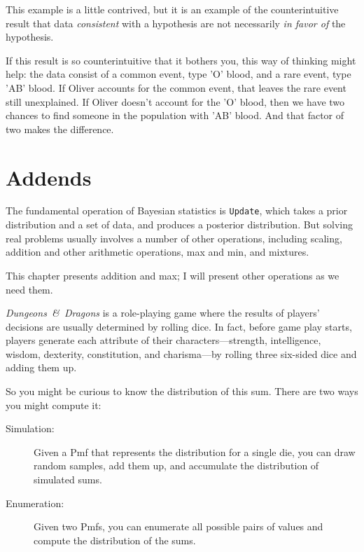 \documentclass[12pt]{book}
\begin{document}
This example is a little contrived, but it is an example of
the counterintuitive result that data {\it consistent} with
a hypothesis are not necessarily {\it in favor of}
the hypothesis.

If this result is so counterintuitive that it bothers you,
this way of thinking might help: the data consist of a common
event, type 'O' blood, and a rare event, type 'AB' blood.
If Oliver accounts for the common event, that leaves the rare
event still unexplained.  If Oliver doesn't account for the
'O' blood, then we have two chances to find someone in the
population with 'AB' blood.  And that factor of two makes
the difference.


\section{Addends}
\label{addends}

The fundamental operation of Bayesian statistics is
{\tt Update}, which takes a prior distribution and a set
of data, and produces a posterior distribution.  But solving
real problems usually involves a number of other operations,
including scaling, addition and other arithmetic operations,
max and min, and mixtures.

This chapter presents addition and max; I will present
other operations as we need them.

{\it Dungeons~\&~Dragons} is a role-playing game where the results
of players' decisions are usually determined by rolling dice.
In fact, before game play starts, players generate each
attribute of their characters---strength, intelligence, wisdom,
dexterity, constitution, and charisma---by rolling three
six-sided dice and adding them up.

So you might be curious to know the distribution of this sum.
There are two ways you might compute it:

\begin{description}

\item[Simulation:] Given a Pmf that represents the distribution
for a single die, you can draw random samples, add them up,
and accumulate the distribution of simulated sums.

\item[Enumeration:] Given two Pmfs, you can enumerate all possible
pairs of values and compute the distribution of the sums.

\end{description}
\end{document}
